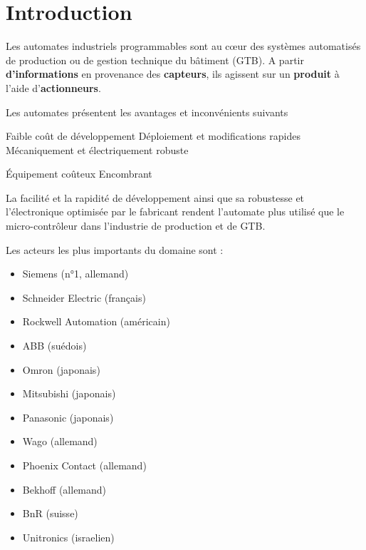 \documentclass[11pt, multicol]{article}
\begin{document}
\UPSTIbuildPage


\section{Introduction}
Les automates industriels programmables sont au cœur des systèmes automatisés de production ou de gestion technique du bâtiment (GTB).
A partir \textbf{d'informations} en provenance des \textbf{capteurs}, ils agissent sur un \textbf{produit} à l'aide d'\textbf{actionneurs}.

Les automates présentent les avantages et inconvénients suivants

\begin{minipage}[t]{.49\linewidth}
	\begin{itemize}
		\itemc Faible coût de développement
		\itemc Déploiement et modifications rapides
		\itemc Mécaniquement et électriquement robuste
	\end{itemize}
\end{minipage}\hfill
\begin{minipage}[t]{.49\linewidth}
	\begin{itemize}
		\itemx Équipement coûteux
		\itemx Encombrant
	\end{itemize}
\end{minipage}

La facilité et la rapidité de développement ainsi que sa robustesse et l'électronique optimisée par le fabricant rendent l'automate plus utilisé que le micro-contrôleur dans l'industrie de production et de GTB.

Les acteurs les plus importants du domaine sont :
\begin{multicols}{2}
	\begin{itemize}
		\item Siemens (n°1, allemand)
		\item Schneider Electric (français)
		\item Rockwell Automation (américain)
		\item ABB (suédois)
		\item Omron (japonais)
		\item Mitsubishi (japonais)
		\item Panasonic (japonais)
		\item Wago (allemand)
		\item Phoenix Contact (allemand)
		\item Bekhoff (allemand)
		\item BnR (suisse)
		\item Unitronics (israelien)
	\end{itemize}
\end{multicols}


\end{document}
